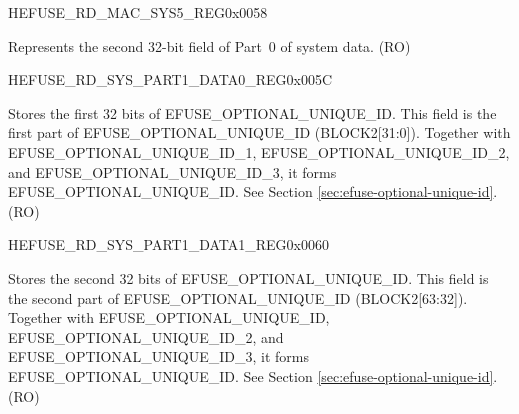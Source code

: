 \begin{register}{H}{EFUSE\_RD\_MAC\_SYS5\_REG}{0x0058}\label{regdesc:EFUSERDMACSYS5REG}
%
\regnewline%
\begin{regdesc}\begin{reglist}
\label{fielddesc:EFUSESYSDATAPART02}\item [EFUSE\_SYS\_DATA\_PART0\_2] Represents the second 32-bit field of Part~0 of system data. (RO)
\end{reglist}\end{regdesc}
\end{register}


\begin{register}{H}{EFUSE\_RD\_SYS\_PART1\_DATA0\_REG}{0x005C}\label{regdesc:EFUSERDSYSPART1DATA0REG}\label{regdesc:EFUSERDSYSPART1DATANREG}
%
\regnewline%
\begin{regdesc}\begin{reglist}
\label{fielddesc:EFUSEOPTIONALUNIQUEID}\item [EFUSE\_OPTIONAL\_UNIQUE\_ID] Stores the first 32 bits of EFUSE\_OPTIONAL\_UNIQUE\_ID. This field is the first part of EFUSE\_OPTIONAL\_UNIQUE\_ID (BLOCK2[31:0]). Together with EFUSE\_OPTIONAL\_UNIQUE\_ID\_1, EFUSE\_OPTIONAL\_UNIQUE\_ID\_2, and EFUSE\_OPTIONAL\_UNIQUE\_ID\_3, it forms EFUSE\_OPTIONAL\_UNIQUE\_ID. See Section \ref{sec:efuse-optional-unique-id}. (RO)
\end{reglist}\end{regdesc}
\end{register}


\begin{register}{H}{EFUSE\_RD\_SYS\_PART1\_DATA1\_REG}{0x0060}\label{regdesc:EFUSERDSYSPART1DATA1REG}
%
\regnewline%
\begin{regdesc}\begin{reglist}
\label{fielddesc:EFUSEOPTIONALUNIQUEID1}\item [EFUSE\_OPTIONAL\_UNIQUE\_ID\_1] Stores the second 32 bits of EFUSE\_OPTIONAL\_UNIQUE\_ID. This field is the second part of EFUSE\_OPTIONAL\_UNIQUE\_ID (BLOCK2[63:32]). Together with EFUSE\_OPTIONAL\_UNIQUE\_ID, EFUSE\_OPTIONAL\_UNIQUE\_ID\_2, and EFUSE\_OPTIONAL\_UNIQUE\_ID\_3, it forms EFUSE\_OPTIONAL\_UNIQUE\_ID. See Section \ref{sec:efuse-optional-unique-id}. (RO)
\end{reglist}\end{regdesc}
\end{register}


